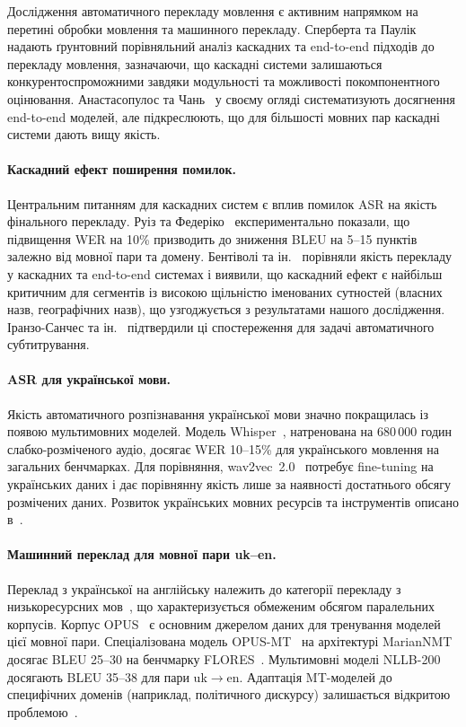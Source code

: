 Дослідження автоматичного перекладу мовлення є активним напрямком
на перетині обробки мовлення та машинного перекладу. Сперберта та
Паулік~\cite{cascade_st} надають ґрунтовний порівняльний аналіз
каскадних та end-to-end підходів до перекладу мовлення, зазначаючи, що
каскадні системи залишаються конкурентоспроможними завдяки модульності
та можливості покомпонентного оцінювання. Анастасопулос та
Чань~\cite{st_survey} у своєму огляді систематизують досягнення
end-to-end моделей, але підкреслюють, що для більшості мовних пар
каскадні системи дають вищу якість.

\paragraph{Каскадний ефект поширення помилок.}
Центральним питанням для каскадних систем є вплив помилок ASR на якість
фінального перекладу. Руіз та Федеріко~\cite{error_propagation}
експериментально показали, що підвищення WER на 10\% призводить до
зниження BLEU на 5--15 пунктів залежно від мовної пари та домену.
Бентіволі та ін.~\cite{bentivogli_cascade} порівняли якість перекладу
у каскадних та end-to-end системах і виявили, що каскадний ефект є
найбільш критичним для сегментів із високою щільністю іменованих
сутностей (власних назв, географічних назв), що узгоджується з
результатами нашого дослідження. Іранзо-Санчес та
ін.~\cite{iranzo_cascade} підтвердили ці спостереження для задачі
автоматичного субтитрування.

\paragraph{ASR для української мови.}
Якість автоматичного розпізнавання української мови значно покращилась
із появою мультимовних моделей. Модель Whisper~\cite{whisper},
натренована на 680\,000 годин слабко-розміченого аудіо, досягає
WER 10--15\% для українського мовлення на загальних бенчмарках. Для
порівняння, wav2vec~2.0~\cite{wav2vec} потребує fine-tuning на
українських даних і дає порівнянну якість лише за наявності
достатнього обсягу розмічених даних. Розвиток українських мовних
ресурсів та інструментів описано в~\cite{uk_nlp}.

\paragraph{Машинний переклад для мовної пари uk--en.}
Переклад з української на англійську належить до категорії перекладу
з низькоресурсних мов~\cite{low_resource_mt}, що характеризується
обмеженим обсягом паралельних корпусів. Корпус OPUS~\cite{opus_corpus}
є основним джерелом даних для тренування моделей цієї мовної пари.
Спеціалізована модель OPUS-MT~\cite{opus_mt} на архітектурі
MarianNMT~\cite{marian_nmt} досягає BLEU 25--30 на бенчмарку
FLORES~\cite{flores}. Мультимовні моделі NLLB-200~\cite{nllb}
досягають BLEU 35--38 для пари uk$\to$en. Адаптація MT-моделей
до специфічних доменів (наприклад, політичного дискурсу) залишається
відкритою проблемою~\cite{domain_adaptation}.

